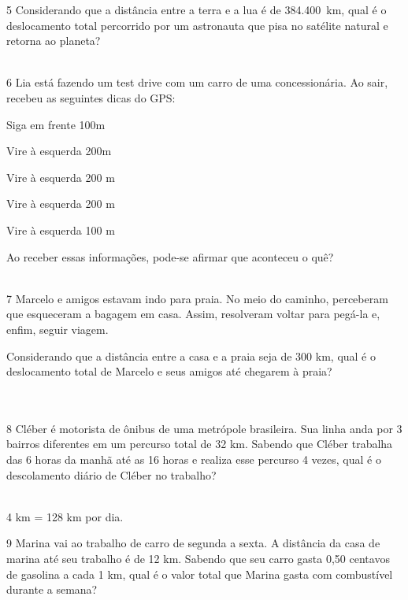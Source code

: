 \num{5} Considerando que a distância entre a terra e a lua é de 384.400~km,
qual é o deslocamento total percorrido por um astronauta que pisa no
satélite natural e retorna ao planeta?

\\

\num{6} Lia está fazendo um test drive com um carro de uma concessionária. Ao
sair, recebeu as seguintes dicas do GPS:

Siga em frente 100m

Vire à esquerda 200m

Vire à esquerda 200 m

Vire à esquerda 200 m

Vire à esquerda 100 m

Ao receber essas informações, pode-se afirmar que aconteceu o quê?

\\

\num{7} Marcelo e amigos estavam indo para praia. No meio do caminho,
perceberam que esqueceram a bagagem em casa. Assim, resolveram voltar
para pegá-la e, enfim, seguir viagem.

Considerando que a distância entre a casa e a praia seja de 300 km, qual
é o deslocamento total de Marcelo e seus amigos até chegarem à praia?

\\
\\

\num{8} Cléber é motorista de ônibus de uma metrópole brasileira. Sua linha
anda por 3 bairros diferentes em um percurso total de 32 km. Sabendo que
Cléber trabalha das 6 horas da manhã até as 16 horas e realiza esse
percurso 4 vezes, qual é o descolamento diário de Cléber no trabalho?

\\

4  km = 128 km por dia.

\num{9} Marina vai ao trabalho de carro de segunda a sexta. A distância da
casa de marina até seu trabalho é de 12 km. Sabendo que seu carro gasta
0,50 centavos de gasolina a cada 1 km, qual é o valor total que Marina
gasta com combustível durante a semana?

